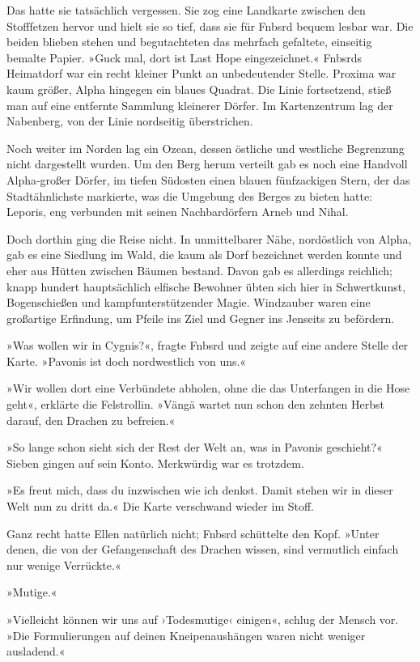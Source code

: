 Das hatte sie tatsächlich vergessen. Sie zog eine Landkarte zwischen den Stofffetzen hervor und hielt sie so tief, dass sie für Fnbsrd bequem lesbar war. Die beiden blieben stehen und begutachteten das mehrfach gefaltete, einseitig bemalte Papier. »Guck mal, dort ist Last Hope eingezeichnet.« Fnbsrds Heimatdorf war ein recht kleiner Punkt an unbedeutender Stelle. Proxima war kaum größer, Alpha hingegen ein blaues Quadrat. Die Linie fortsetzend, stieß man auf eine entfernte Sammlung kleinerer Dörfer. Im Kartenzentrum lag der Nabenberg, von der Linie nordseitig überstrichen.

Noch weiter im Norden lag ein Ozean, dessen östliche und westliche Begrenzung nicht dargestellt wurden. Um den Berg herum verteilt gab es noch eine Handvoll Alpha-großer Dörfer, im tiefen Südosten einen blauen fünfzackigen Stern, der das Stadtähnlichste markierte, was die Umgebung des Berges zu bieten hatte: Leporis, eng verbunden mit seinen Nachbardörfern Arneb und Nihal.

Doch dorthin ging die Reise nicht. In unmittelbarer Nähe, nordöstlich von Alpha, gab es eine Siedlung im Wald, die kaum als Dorf bezeichnet werden konnte und eher aus Hütten zwischen Bäumen bestand. Davon gab es allerdings reichlich; knapp hundert hauptsächlich elfische Bewohner übten sich hier in Schwertkunst, Bogenschießen und kampfunterstützender Magie. Windzauber waren eine großartige Erfindung, um Pfeile ins Ziel und Gegner ins Jenseits zu befördern.

»Was wollen wir in Cygnis?«, fragte Fnbsrd und zeigte auf eine andere Stelle der Karte. »Pavonis ist doch nordwestlich von uns.«

»Wir wollen dort eine Verbündete abholen, ohne die das Unterfangen in die Hose geht«, erklärte die Felstrollin. »Vängä wartet nun schon den zehnten Herbst darauf, den Drachen zu befreien.«

»So lange schon sieht sich der Rest der Welt an, was in Pavonis geschieht?« Sieben gingen auf sein Konto. Merkwürdig war es trotzdem.

»Es freut mich, dass du inzwischen wie ich denkst. Damit stehen wir in dieser Welt nun zu dritt da.« Die Karte verschwand wieder im Stoff.

Ganz recht hatte Ellen natürlich nicht; Fnbsrd schüttelte den Kopf. »Unter denen, die von der Gefangenschaft des Drachen wissen, sind vermutlich einfach nur wenige Verrückte.«

»Mutige.«

»Vielleicht können wir uns auf ›Todesmutige‹ einigen«, schlug der Mensch vor. »Die Formulierungen auf deinen Kneipenaushängen waren nicht weniger ausladend.«

